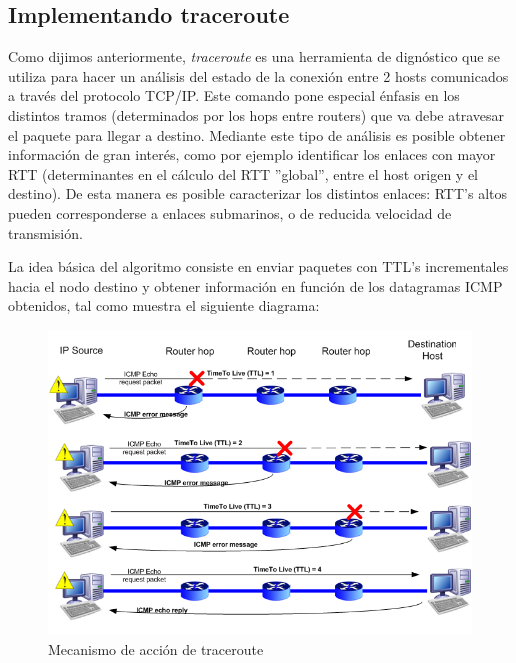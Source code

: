 \subsection{Implementando traceroute}

Como dijimos anteriormente, \emph{traceroute} es una herramienta de dign\'ostico que se utiliza para hacer
un an\'alisis del estado de la conexi\'on entre 2 hosts comunicados a trav\'es del protocolo TCP/IP.
Este comando pone especial \'enfasis en los distintos tramos (determinados por los hops entre routers)
que va debe atravesar el paquete para llegar a destino.
Mediante este tipo de an\'alisis es posible obtener informaci\'on de gran inter\'es, como por
ejemplo identificar los enlaces con mayor RTT (determinantes en el c\'alculo del
RTT ''global'', entre el host origen y el destino). De esta manera es posible caracterizar los distintos
enlaces: RTT's altos pueden corresponderse a enlaces submarinos, o de reducida velocidad de transmisi\'on.

La idea b\'asica del algoritmo consiste en enviar paquetes con TTL's incrementales hacia el nodo destino
y obtener informaci\'on en funci\'on de los datagramas ICMP obtenidos, tal como muestra el siguiente
diagrama:

\begin{figure}[!h]
  \begin{center}
      \includegraphics[scale=0.4]{imagenes/traceroute.png}
      \caption{Mecanismo de acci\'on de traceroute}
      \label{fig:contra1}
  \end{center}
\end{figure}

